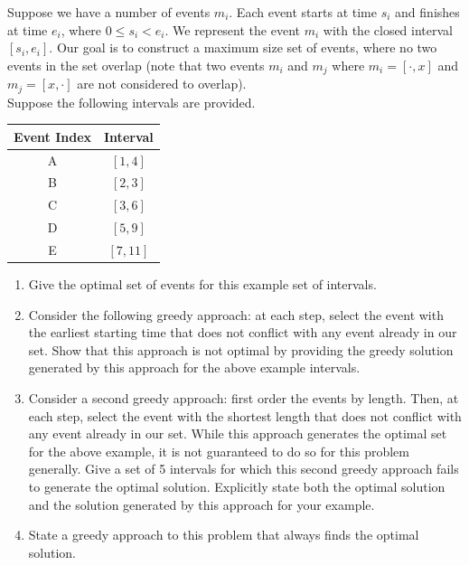 \documentclass[9pt]{article}
\begin{document}
\newpage



\vspace{5mm}

\item Suppose we have a number of events $m_{i}$. Each event starts at time $s_{i}$ and finishes at time $e_{i}$, where $0 \leq s_{i} < e_{i}$. We represent the event $m_{i}$ with the closed interval $[s_{i}, e_{i}].$ Our goal is to construct a maximum size set of events, where no two events in the set overlap (note that two events $m_{i}$ and $m_{j}$ where $m_{i} = [\cdot, x]$ and $m_{j} = [x, \cdot]$ are not considered to overlap). \\

Suppose the following intervals are provided.

\begin{center}
\begin{tabular}{c|c}
Event Index & Interval \\ \hline
A & $[1, 4]$ \\ 
B & $[2, 3]$ \\
C & $[3, 6]$ \\
D & $[5, 9]$ \\
E & $[7, 11]$
\end{tabular}
\end{center}

\begin{enumerate}

\item Give the optimal set of events for this example set of intervals.

\item Consider the following greedy approach: at each step, select the event with the earliest starting time that does not conflict with any event already in our set. Show that this approach is not optimal by providing the greedy solution generated by this approach for the above example intervals.

\item Consider a second greedy approach: first order the events by length. Then, at each step, select the event with the shortest length that does not conflict with any event already in our set. While this approach generates the optimal set for the above example, it is not guaranteed to do so for this problem generally. Give a set of 5 intervals for which this second greedy approach fails to generate the optimal solution. Explicitly state both the optimal solution and the solution generated by this approach for your example.

\item State a greedy approach to this problem that always finds the optimal solution.

\end{enumerate}
\end{document}
